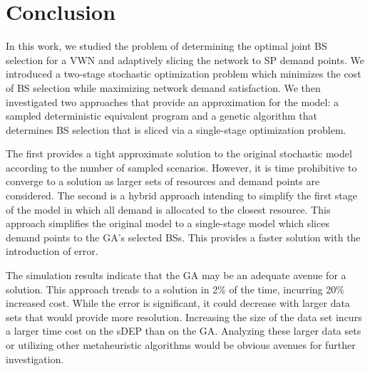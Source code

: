 \documentclass[conference]{IEEEtran}
\begin{document}
\section{Conclusion} \label{sec:conclusion}

In this work, we studied the problem of determining the optimal joint BS selection for a VWN and adaptively slicing the network to SP demand points.  We introduced a two-stage stochastic optimization problem which minimizes the cost of BS selection while maximizing network demand satisfaction.  We then investigated two approaches that provide an approximation for the model: a sampled deterministic equivalent program and a genetic algorithm that determines BS selection that is sliced via a single-stage optimization problem.

The first provides a tight approximate solution to the original stochastic model according to the number of sampled scenarios.  However, it is time prohibitive to converge to a solution as larger sets of resources and demand points are considered.  The second is a hybrid approach intending to simplify the first stage of the model in which all demand is allocated to the closest resource.  This approach simplifies the original model to a single-stage model which slices demand points to the GA's selected BSs.  This provides a faster solution with the introduction of error.

The simulation results indicate that the GA may be an adequate avenue for a solution.  This approach trends to a solution in 2\% of the time, incurring 20\% increased cost.  While the error is significant, it could decrease with larger data sets that would provide more resolution.  Increasing the size of the data set incurs a larger time cost on the sDEP than on the GA.  Analyzing these larger data sets or utilizing other metaheuristic algorithms would be obvious avenues for further investigation.



\end{document}
